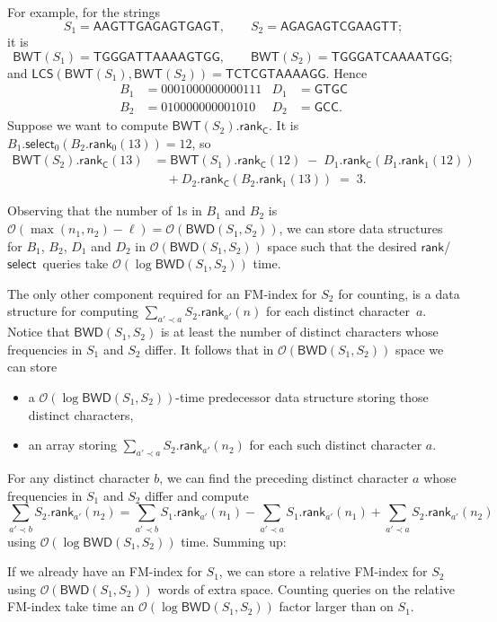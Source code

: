 \documentclass{llncs}
\newcommand{\Oh}[1]
  {\ensuremath{\mathcal{O}\!\left( {#1} \right)}}
\newcommand{\LCS}
  {\ensuremath{\mathsf{LCS}}}
\newcommand{\BWD}
  {\ensuremath{\mathsf{BWD}}}
\newcommand{\BWT}
  {\ensuremath{\mathsf{BWT}}}
\newcommand{\rank}
  {\ensuremath{\mathsf{rank}}}
\newcommand{\select}
  {\ensuremath{\mathsf{select}}}
\begin{document}
For example, for the strings
$$
S_1 = \mathsf{AAGTTGAGAGTGAGT},\qquad
S_2 = \mathsf{AGAGAGTCGAAGTT};
$$
it is
$$
\BWT (S_1) = \mathsf{TGGGATTAAAAGTGG},\qquad
\BWT (S_2) = \mathsf{TGGGATCAAAATGG};
$$
and $\LCS(\BWT (S_1),\BWT (S_2)) = \mathsf{TCTCGTAAAAGG}$. Hence
\begin{align*}
B_1  & = 0001000000000111  & D_1  &= \mathsf{GTGC}\\
B_2  & = 010000000001010   & D_2  & = \mathsf{GCC}.
\end{align*}
Suppose we want to compute $\BWT (S_2).\rank_\mathsf{C}$. It is
\(B_1.\select_0 (B_2.\rank_0 (13)) = 12\), so
\begin{align*}
\BWT (S_2).\rank_\mathsf{C} (13)
& = \BWT (S_1).\rank_\mathsf{C} (12)\; -\; D_1.\rank_\mathsf{C} (B_1.\rank_1 (12))
\\
& \quad + D_2.\rank_\mathsf{C} (B_2.\rank_1 (13)) \;=\; 3.
\end{align*}


Observing that the number of 1s in $B_1$ and $B_2$ is \(\Oh{\max (n_1, n_2) -
\ell} = \Oh{\BWD (S_1, S_2)}\), we can store data structures for $B_1$,
$B_2$, $D_1$ and $D_2$ in $\Oh{\BWD (S_1, S_2)}$ space such that the desired
\rank/\select\ queries take $\Oh{\log \BWD (S_1, S_2)}$ time.

The only other component required for an FM-index for $S_2$ for counting, is a data
structure for computing  \(\sum_{a' \prec a} S_2.\rank_{a'} (n)\) for each
distinct character~$a$. Notice that \(\BWD (S_1, S_2)\) is at least the
number of distinct characters whose frequencies in $S_1$ and $S_2$ differ. It
follows that in $\Oh{\BWD (S_1, S_2)}$ space we can store
\begin{itemize}
\item a $\Oh{\log \BWD (S_1, S_2)}$-time predecessor data structure
    storing those distinct characters,
\item an array storing \(\sum_{a' \prec a} S_2.\rank_{a'} (n_2)\) for
    each such distinct character $a$.
\end{itemize}
For any distinct character $b$, we can find the preceding distinct character
$a$ whose frequencies in $S_1$ and $S_2$ differ and compute
\[\sum_{a' \prec b} S_2.\rank_{a'} (n_2) = \sum_{a' \prec b} S_1.\rank_{a'} (n_1) - \sum_{a' \prec a} S_1.\rank_{a'} (n_1) + \sum_{a' \prec a} S_2.\rank_{a'} (n_2)\]
using $\Oh{\log \BWD (S_1, S_2)}$ time. Summing up:

\begin{theorem} \label{theo:counting}
If we already have an FM-index for $S_1$, we can store a relative FM-index
for $S_2$ using $\Oh{\BWD (S_1, S_2)}$ words of extra space. Counting queries
on the relative FM-index take time an $\Oh{\log \BWD (S_1, S_2)}$ factor
larger than on $S_1$.
\end{theorem}
\end{document}
